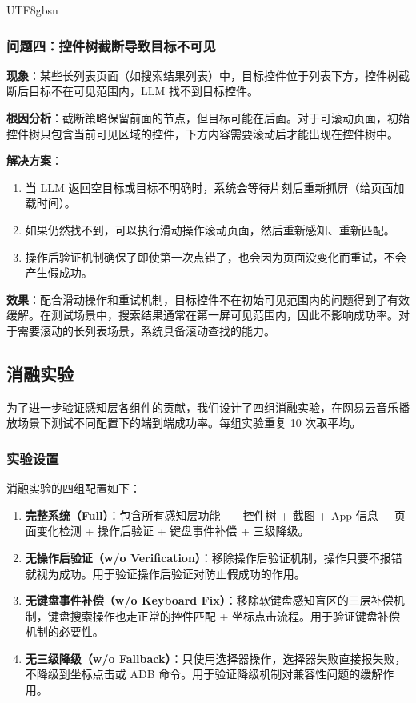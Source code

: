 \documentclass{article}
\begin{document}
\begin{CJK}{UTF8}{gbsn}
\subsubsection{问题四：控件树截断导致目标不可见}

\textbf{现象}：某些长列表页面（如搜索结果列表）中，目标控件位于列表下方，控件树截断后目标不在可见范围内，LLM 找不到目标控件。

\textbf{根因分析}：截断策略保留前面的节点，但目标可能在后面。对于可滚动页面，初始控件树只包含当前可见区域的控件，下方内容需要滚动后才能出现在控件树中。

\textbf{解决方案}：
\begin{enumerate}[leftmargin=1.5em]
  \item 当 LLM 返回空目标或目标不明确时，系统会等待片刻后重新抓屏（给页面加载时间）。
  \item 如果仍然找不到，可以执行滑动操作滚动页面，然后重新感知、重新匹配。
  \item 操作后验证机制确保了即使第一次点错了，也会因为页面没变化而重试，不会产生假成功。
\end{enumerate}

\textbf{效果}：配合滑动操作和重试机制，目标控件不在初始可见范围内的问题得到了有效缓解。在测试场景中，搜索结果通常在第一屏可见范围内，因此不影响成功率。对于需要滚动的长列表场景，系统具备滚动查找的能力。

\subsection{消融实验}

为了进一步验证感知层各组件的贡献，我们设计了四组消融实验，在网易云音乐播放场景下测试不同配置下的端到端成功率。每组实验重复 10 次取平均。

\subsubsection{实验设置}

消融实验的四组配置如下：

\begin{enumerate}[leftmargin=1.5em]
  \item \textbf{完整系统（Full）}：包含所有感知层功能——控件树 + 截图 + App 信息 + 页面变化检测 + 操作后验证 + 键盘事件补偿 + 三级降级。
  \item \textbf{无操作后验证（w/o Verification）}：移除操作后验证机制，操作只要不报错就视为成功。用于验证操作后验证对防止假成功的作用。
  \item \textbf{无键盘事件补偿（w/o Keyboard Fix）}：移除软键盘感知盲区的三层补偿机制，键盘搜索操作也走正常的控件匹配 + 坐标点击流程。用于验证键盘补偿机制的必要性。
  \item \textbf{无三级降级（w/o Fallback）}：只使用选择器操作，选择器失败直接报失败，不降级到坐标点击或 ADB 命令。用于验证降级机制对兼容性问题的缓解作用。
\end{enumerate}


\end{CJK}
\end{document}
